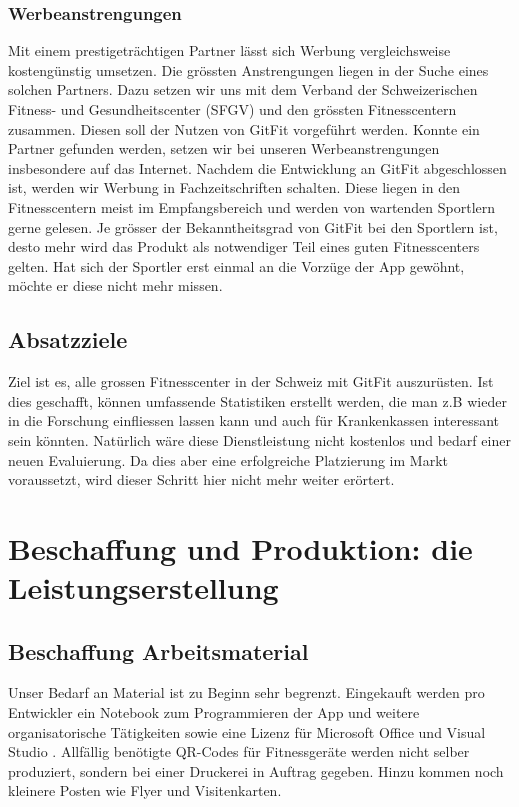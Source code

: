 \subsubsection{Werbeanstrengungen}
Mit einem prestigeträchtigen Partner lässt sich Werbung vergleichsweise kostengünstig umsetzen. Die grössten Anstrengungen liegen in der Suche eines solchen Partners. Dazu setzen wir uns mit dem Verband der Schweizerischen Fitness- und Gesundheitscenter (SFGV) und den grössten Fitnesscentern zusammen. Diesen soll der Nutzen von GitFit vorgeführt werden. Konnte ein Partner gefunden werden, setzen wir bei unseren Werbeanstrengungen insbesondere auf das Internet. Nachdem die Entwicklung an GitFit abgeschlossen ist, werden wir Werbung in Fachzeitschriften schalten. Diese liegen in den Fitnesscentern meist im Empfangsbereich und werden von wartenden Sportlern gerne gelesen. Je grösser der Bekanntheitsgrad von GitFit bei den Sportlern ist, desto mehr wird das Produkt als notwendiger Teil eines guten Fitnesscenters gelten. Hat sich der Sportler erst einmal an die Vorzüge der App gewöhnt, möchte er diese nicht mehr missen.

\subsection{Absatzziele}
Ziel ist es, alle grossen Fitnesscenter in der Schweiz mit GitFit auszurüsten. Ist dies geschafft, können umfassende Statistiken erstellt werden, die man z.B wieder in die Forschung einfliessen lassen kann und auch für Krankenkassen interessant sein könnten. Natürlich wäre diese Dienstleistung nicht kostenlos und bedarf einer neuen Evaluierung. Da dies aber eine erfolgreiche Platzierung im Markt voraussetzt, wird dieser Schritt hier nicht mehr weiter erörtert.

\clearpage
\section{Beschaffung und Produktion: die Leistungserstellung}
\subsection{Beschaffung Arbeitsmaterial}
Unser Bedarf an Material ist zu Beginn sehr begrenzt. Eingekauft werden pro Entwickler ein Notebook zum Programmieren der App und weitere organisatorische Tätigkeiten sowie eine Lizenz für Microsoft Office und Visual Studio \cite{visual-studio}. Allfällig benötigte QR-Codes für Fitnessgeräte werden nicht selber produziert, sondern bei einer Druckerei in Auftrag gegeben. Hinzu kommen noch kleinere Posten wie Flyer und Visitenkarten.
